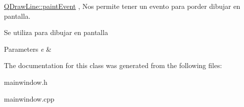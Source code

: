 \hyperlink{class_q_draw_line_ad2f14d95531049f1bf54474dbf60965b}{Q\+Draw\+Line\+::paint\+Event} , Nos permite tener un evento para porder dibujar en pantalla. 

Se utiliza para dibujar en pantalla


\begin{DoxyParams}{Parameters}
{\em e} & \\
\hline
\end{DoxyParams}


The documentation for this class was generated from the following files\+:\begin{DoxyCompactItemize}
\item 
mainwindow.\+h\item 
mainwindow.\+cpp\end{DoxyCompactItemize}
